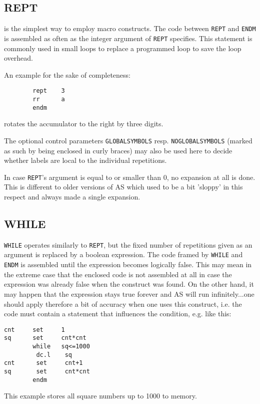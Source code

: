 \documentclass[12pt,twoside]{report}
\makeatletter
\newcommand{\tty}[1]{{\tt #1}}
\newcommand{\ttindex}[1]{\index{#1@{\tt #1}}}
\makeatother
\begin{document}
\subsection{REPT}
\ttindex{REPT}

is the simplest way to employ macro constructs.  The code between
\tty{REPT} and \tty{ENDM} is assembled as often as the integer argument of
\tty{REPT} specifies.  This statement is commonly used in small loops to
replace a programmed loop to save the loop overhead.

An example for the sake of completeness:
\begin{verbatim}
        rept    3
        rr      a
        endm
\end{verbatim}
rotates the accumulator to the right by three digits.

The optional control parameters \tty{GLOBALSYMBOLS}
resp. \tty{NOGLOBALSYMBOLS} (marked as such by being enclosed in curly
braces) may also be used here to decide whether labels are local to the
individual repetitions.

In case \tty{REPT}'s argument is equal to or smaller than 0, no expansion
at all is done.  This is different to older versions of AS which used to
be a bit 'sloppy' in this respect and always made a single expansion.


\subsection{WHILE}
\ttindex{WHILE}

\tty{WHILE} operates similarly to \tty{REPT}, but the fixed number of
repetitions given as an argument is replaced by a boolean expression.  The
code framed by \tty{WHILE} and \tty{ENDM} is assembled until the
expression becomes logically false.  This may mean in the extreme case
that the enclosed code is not assembled at all in case the expression was
already false when the construct was found.  On the other hand, it may
happen that the expression stays true forever and AS will run
infinitely...one should apply therefore a bit of accuracy when one uses
this construct, i.e. the code must contain a statement that influences the
condition, e.g. like this:
\begin{verbatim}
cnt     set     1
sq      set     cnt*cnt
        while   sq<=1000
         dc.l    sq
cnt      set     cnt+1
sq       set     cnt*cnt
        endm
\end{verbatim}
This example stores all square numbers up to 1000 to memory.
\end{document}
